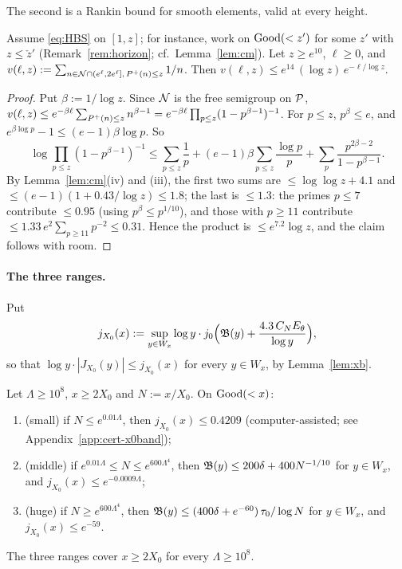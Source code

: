 The second is a Rankin bound for smooth elements, valid at every height.

\begin{lemma}\label{lem:rankin-crude}
Assume \eqref{eq:HBS} on $[1,z]$; for instance, work on $\mathrm{Good}(<z')$ for some $z'$ with $z\le\check z'$
(Remark~\ref{rem:horizon}; cf.\ Lemma~\ref{lem:cm}). Let $z\ge e^{10}$, $\ell\ge0$, and $v(\ell,z):=\sum_{n\in\mathcal{N}\cap(e^\ell,2e^\ell],\,P^{+}(n)\le z}1/n$. Then $v(\ell,z)\le e^{14}\,(\log z)\,e^{-\ell/\log z}$.
\end{lemma}

\begin{proof}
Put $\beta:=1/\log z$. Since $\mathcal{N}$ is the free semigroup on $\mathcal{P}$,
$v(\ell,z)\le e^{-\beta\ell}\sum_{P^{+}(n)\le z}n^{\beta-1}=e^{-\beta\ell}\prod_{p\le z}(1-p^{\beta-1})^{-1}$. For $p\le z$,
$p^\beta\le e$, and $e^{\beta\log p}-1\le(e-1)\beta\log p$. So
\[
  \log\prod_{p\le z}(1-p^{\beta-1})^{-1}\le\sum_{p\le z}\frac1p+(e-1)\beta\sum_{p\le z}\frac{\log p}p
  +\sum_{p}\frac{p^{2\beta-2}}{1-p^{\beta-1}}.
\]
By Lemma~\ref{lem:cm}(iv) and (iii), the first two sums are $\le\log\log z+4.1$ and $\le(e-1)(1+0.43/\log z)\le1.8$; the
last is $\le1.3$: the primes $p\le7$ contribute $\le0.95$ (using $p^\beta\le p^{1/10}$), and those with $p\ge11$
contribute $\le1.33\,e^2\sum_{p\ge11}p^{-2}\le0.31$. Hence the product is $\le e^{7.2}\log z$, and the claim follows with
room.
\end{proof}

\paragraph{The three ranges.} Put
\begin{equation}\label{eq:jX0}
  j_{X_0}(x):=\sup_{y\in W_x}\log y\cdot j_0\Bigl(\mathfrak{B}(y)+\frac{4.3\,C_NE_\theta}{\log y}\Bigr),
\end{equation}
so that $\log y\cdot|J_{X_0}(y)|\le j_{X_0}(x)$ for every $y\in W_x$, by Lemma~\ref{lem:xb}.

\begin{proposition}\label{prop:xb-ranges}
Let $\Lambda\ge10^8$, $x\ge2X_0$ and $N:=x/X_0$. On $\mathrm{Good}(<x)$:
\begin{enumerate}[label=(\roman*)]
\item (small) if $N\le e^{0.01\Lambda}$, then $j_{X_0}(x)\le0.4209$ (computer-assisted; see Appendix~\ref{app:cert-x0band});
\item (middle) if $e^{0.01\Lambda}\le N\le e^{600\Lambda^4}$, then $\mathfrak{B}(y)\le200\delta+400N^{-1/10}$ for $y\in W_x$, and
  $j_{X_0}(x)\le e^{-0.0009\Lambda}$;
\item (huge) if $N\ge e^{600\Lambda^4}$, then $\mathfrak{B}(y)\le(400\delta+e^{-60})\,\tau_0/\log N$ for $y\in W_x$, and
  $j_{X_0}(x)\le e^{-59}$.
\end{enumerate}
The three ranges cover $x\ge2X_0$ for every $\Lambda\ge10^8$.
\end{proposition}

